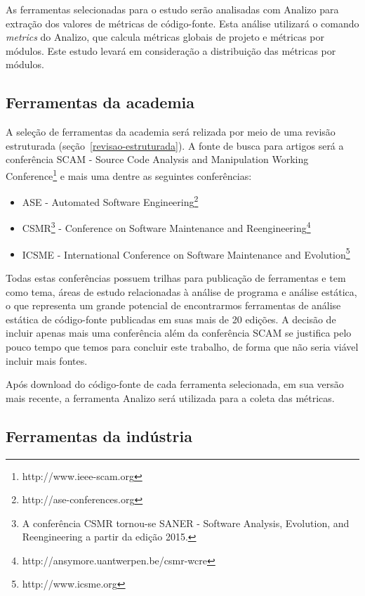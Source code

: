 As ferramentas selecionadas para o estudo serão analisadas com Analizo para
extração dos valores de métricas de código-fonte.  Esta análise utilizará o
comando {\it metrics} do Analizo, que calcula métricas globais de projeto e
métricas por módulos. Este estudo levará em consideração a distribuição das
métricas por módulos.

\subsection{Ferramentas da academia} \label{ferramentas-da-academia}

A seleção de ferramentas da academia será relizada por meio de uma revisão
estruturada (seção~\ref{revisao-estruturada}). A fonte de busca para artigos
será a conferência SCAM - Source Code Analysis and Manipulation Working
Conference\footnote{http://www.ieee-scam.org} e mais uma dentre as seguintes
conferências:

\begin{itemize}
  \item ASE - Automated Software
    Engineering\footnote{http://ase-conferences.org}
  \item CSMR\footnote{A conferência CSMR tornou-se SANER - Software Analysis,
    Evolution, and Reengineering a partir da edição 2015.} - Conference on
    Software Maintenance and
    Reengineering\footnote{http://ansymore.uantwerpen.be/csmr-wcre}
  \item ICSME - International Conference on Software Maintenance and
    Evolution\footnote{http://www.icsme.org}
\end{itemize}

Todas estas conferências possuem trilhas para publicação de ferramentas e tem
como tema, áreas de estudo relacionadas à análise de programa e análise
estática, o que representa um grande potencial de encontrarmos ferramentas de
análise estática de código-fonte publicadas em suas mais de 20 edições. A
decisão de incluir apenas mais uma conferência além da conferência SCAM se
justifica pelo pouco tempo que temos para concluir este trabalho, de forma que
não seria viável incluir mais fontes.

Após download do código-fonte de cada ferramenta selecionada, em sua versão
mais recente, a ferramenta Analizo será utilizada para a coleta das métricas. 

\subsection{Ferramentas da indústria} \label{ferramentas-da-industria}


